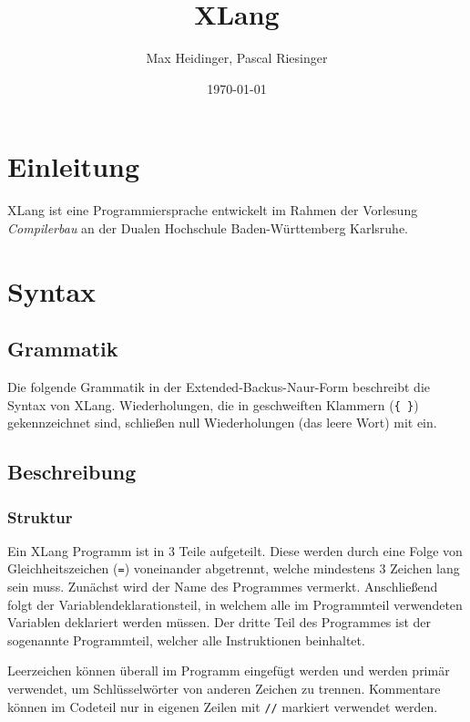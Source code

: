 \documentclass[a4paper]{article}
\title{XLang}
\author{Max Heidinger, Pascal Riesinger}
\date{\today}
\begin{document}
\maketitle


\section{Einleitung}

XLang ist eine Programmiersprache entwickelt im Rahmen der Vorlesung \textit{Compilerbau} an der
Dualen Hochschule Baden-Württemberg Karlsruhe.

\section{Syntax}

\subsection{Grammatik}

Die folgende Grammatik in der Extended-Backus-Naur-Form beschreibt die Syntax von XLang.
Wiederholungen, die in geschweiften Klammern (\texttt{\{ \}}) gekennzeichnet sind, schließen null Wiederholungen (das leere Wort) mit ein.




\subsection{Beschreibung}

\subsubsection{Struktur}

Ein XLang Programm ist in 3 Teile aufgeteilt.
Diese werden durch eine Folge von Gleichheitszeichen (\texttt{=}) voneinander abgetrennt, welche
mindestens 3 Zeichen lang sein muss.
Zunächst wird der Name des Programmes vermerkt.
Anschließend folgt der Variablendeklarationsteil, in welchem alle im Programmteil verwendeten
Variablen deklariert werden müssen.
Der dritte Teil des Programmes ist der sogenannte Programmteil, welcher alle Instruktionen
beinhaltet.

Leerzeichen können überall im Programm eingefügt werden und werden primär verwendet, um
Schlüsselwörter von anderen Zeichen zu trennen.
Kommentare können im Codeteil nur in eigenen Zeilen mit \texttt{//} markiert verwendet werden.
\end{document}
